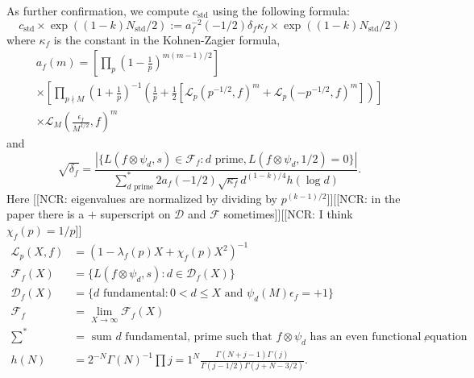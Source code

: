 \documentclass[11pt]{amsart}
\newcommand{\ncr}[1]{{\color{blue}\textsf{[[NCR: #1]]}}}
\newcommand     {\abs}[1]       {{\left\lvert{#1}\right\rvert}}
\begin{document}
As further confirmation, we compute $c_\text{std}$ using the following formula:
\[
c_\text{std} \times \exp((1-k)N_\text{std}/2) := a_f^{-2}(-1/2)\delta_f \kappa_f \times \exp((1-k)N_\text{std}/2)
\]
where $\kappa_f$ is the constant in the Kohnen-Zagier formula, 
\begin{multline*}
a_f(m) = \left [\prod_p \left ( 1-\tfrac{1}{p}\right )^{m(m-1)/2}\right ] \\
\times \left [ \prod_{p \nmid M} \left( 1+\tfrac{1}{p}\right )^{-1}\left(\tfrac{1}{p} + \tfrac{1}{2}\left [ \mathscr{L}_p(p^{-1/2},f)^m + \mathscr{L}_p(-p^{-1/2},f)^m\right ] \right ) \right] \\
\times \mathscr{L}_M\left (\tfrac{\epsilon_f}{M^{1/2}},f\right )^m 
\end{multline*}
and 
\[
\sqrt{\delta_f} = \frac{\abs{\{ L(f\otimes\psi_d, s)\in \mathscr{F}_f: d\text{ prime}, L(f\otimes \psi_d , 1/2)=0\}}}{\sum^*_{d\text{ prime}} 2a_f(-1/2)\sqrt{\kappa_f}d^{(1-k)/4} h(\log d)}.  
\]
Here \ncr{eigenvalues are normalized by dividing by $p^{(k-1)/2}$}\ncr{in the paper there is a $+$ superscript on $\mathscr{D}$ and $\mathscr{F}$ sometimes}\ncr{I think $\chi_f(p)=1/p$}
\begin{align*}
\mathscr{L}_p(X,f) &= (1-\lambda_f(p)X+\chi_f(p)X^2)^{-1} \\
\mathscr{F}_f(X) &= \{L(f\otimes\psi_d, s): d\in \mathscr{D}_f(X)\}\\
\mathscr{D}_f(X) &= \{d \text{ fundamental}: 0<d \leq X\text{ and }\psi_d(M)\epsilon_f=+1\}\\
\mathscr{F}_f &= \lim_{X\to\infty} \mathscr{F}_f(X)\\
\sum^* &=  \text{ sum $d$ fundamental, prime such that $f\otimes \psi_d$ has an even functional equation},\\
h(N) &= 2^{-N}\Gamma(N)^{-1} \prod{j=1}^N \frac{\Gamma(N+j-1)\Gamma(j)}{\Gamma(j-1/2)\Gamma(j+N-3/2)}.
\end{align*}
 







 

\end{document}
